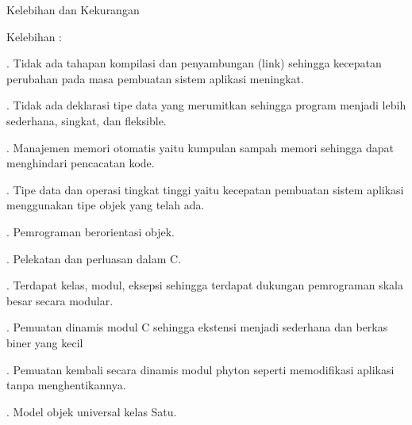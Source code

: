 \noindent 
{\fontsize{14pt}{14pt}\selectfont Kelebihan dan Kekurangan \\} \par
\vspace{14pt}
\noindent 
{\fontsize{14pt}{14pt}\selectfont Kelebihan : \\} \par
\noindent 
{\fontsize{14pt}{14pt}. Tidak ada tahapan kompilasi dan penyambungan (link) sehingga kecepatan perubahan pada masa pembuatan sistem aplikasi meningkat. \\} \par
\vspace{14pt}
\noindent 
{\fontsize{14pt}{14pt}. Tidak ada deklarasi tipe data yang merumitkan sehingga program menjadi lebih sederhana, singkat, dan fleksible. \\} \par
\vspace{14pt}
\noindent 
{\fontsize{14pt}{14pt}. Manajemen memori otomatis yaitu kumpulan sampah memori sehingga dapat menghindari pencacatan kode. \\} \par
\noindent 
{\fontsize{14pt}{14pt}. Tipe data dan operasi tingkat tinggi yaitu kecepatan pembuatan sistem aplikasi menggunakan tipe objek yang telah ada. \\} \par
\noindent 
{\fontsize{14pt}{14pt}. Pemrograman berorientasi objek. \\} \par
\noindent 
{\fontsize{14pt}{14pt}. Pelekatan dan perluasan dalam C. \\} \par
\noindent 
{\fontsize{14pt}{14pt}. Terdapat kelas, modul, eksepsi sehingga terdapat dukungan pemrograman skala besar secara modular. \\} \par
\noindent 
{\fontsize{14pt}{14pt}. Pemuatan dinamis modul C sehingga ekstensi menjadi sederhana dan berkas biner yang kecil \\} \par
\noindent 
{\fontsize{14pt}{14pt}. Pemuatan kembali secara dinamis modul phyton seperti memodifikasi aplikasi tanpa menghentikannya. \\} \par
\noindent 
{\fontsize{14pt}{14pt}. Model objek universal kelas Satu. \\} \par
